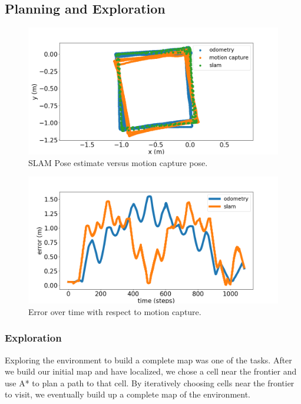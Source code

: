 \documentclass[journal]{IEEEtran}
\begin{document}
        \subsection{Planning and Exploration}
        
        \begin{figure}[t]
            \centering
            \includegraphics[width=1\linewidth]{slam_squares.png}
            \caption{SLAM Pose estimate versus motion capture pose.}
            \label{fig:slam_squares}
        \end{figure}
        
        \begin{figure}
            \centering
            \includegraphics[width=1\linewidth]{slam_squares_error.png}
            \caption{Error over time with respect to motion capture.}
            \label{fig:slam_squares_error.}
        \end{figure}
        
        \subsubsection{Exploration}
        
        Exploring the environment to build a complete map was one of the tasks. After we build our initial map and have localized, we chose a cell near the frontier and use A* to plan a path to that cell. By iteratively choosing cells near the frontier to visit, we eventually build up a complete map of the environment.
        
\end{document}
